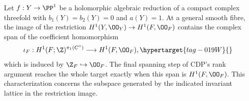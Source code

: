 \begin{proposition}\hypertarget{tag-01FV}{}\label{cdp:st:D.1.10}

Let $f:Y\to\PP^1$ be a holomorphic algebraic reduction of a compact
complex threefold with $b_1(Y)=b_2(Y)=0$ and $a(Y)=1$.
At a general smooth fibre, the image of the restriction
$H^1(Y,\OO_Y)\to H^1(F,\OO_F)$ contains the complex span of
the coefficient homomorphism
\begin{equation}
\iota_F:H^1(F;\Z)^{\pi_1(C^\circ)}
 \longrightarrow H^1(F,\OO_F),                         \hypertarget{tag-019W}{}\label{cdp:eq:D4}
\end{equation}
which is induced by $\Z_F\hookrightarrow\OO_F$.
The final spanning step of CDP's rank argument reaches the whole
target exactly when this span is $H^1(F,\OO_F)$. This characterization concerns the subspace generated by the
indicated invariant lattice in the restriction image.
\end{proposition}


